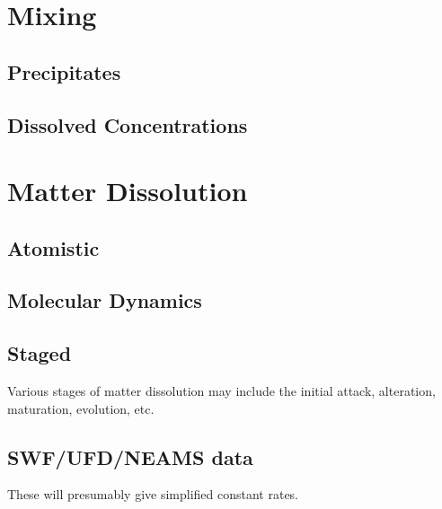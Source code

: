 \section{Mixing}

\subsection{Precipitates}

\subsection{Dissolved Concentrations}



\section{Matter Dissolution}

\subsection{ Atomistic }

\subsection{ Molecular Dynamics } 

\subsection{ Staged }

Various stages of matter dissolution may include the initial attack, alteration, 
maturation, evolution, etc.

\subsection{ SWF/UFD/NEAMS data}

These will presumably give simplified constant rates. 



